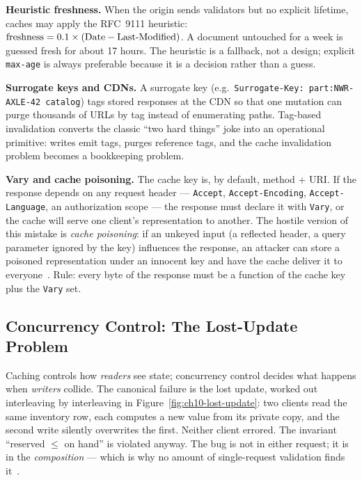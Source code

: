 \textbf{Heuristic freshness.} When the origin sends validators but no
explicit lifetime, caches may apply the RFC~9111 heuristic:
$\text{freshness} = 0.1 \times (\text{Date} - \text{Last\text{-}Modified})$.
A document untouched for a week is guessed fresh for about 17 hours. The
heuristic is a fallback, not a design; explicit \texttt{max-age} is always
preferable because it is a decision rather than a guess.

\textbf{Surrogate keys and CDNs.} A surrogate key (e.g.\
\texttt{Surrogate-Key: part:NWR-AXLE-42 catalog}) tags stored responses at
the CDN so that one mutation can purge thousands of URLs by tag instead of
enumerating paths. Tag-based invalidation converts the classic ``two hard
things'' joke into an operational primitive: writes emit tags, purges
reference tags, and the cache invalidation problem becomes a bookkeeping
problem.

\textbf{Vary and cache poisoning.} The cache key is, by default, method +
URI. If the response depends on any request header --- \texttt{Accept},
\texttt{Accept-Encoding}, \texttt{Accept-Language}, an authorization scope
--- the response must declare it with \texttt{Vary}, or the cache will serve
one client's representation to another. The hostile version of this mistake
is \emph{cache poisoning}: if an unkeyed input (a reflected header, a query
parameter ignored by the key) influences the response, an attacker can store
a poisoned representation under an innocent key and have the cache deliver
it to everyone~\cite{nygard2018releaseit}. Rule: every byte of the response
must be a function of the cache key plus the \texttt{Vary} set.

\subsection{Concurrency Control: The Lost-Update Problem}
\label{sec:ch10-concurrency}

Caching controls how \emph{readers} see state; concurrency control decides
what happens when \emph{writers} collide. The canonical failure is the lost
update, worked out interleaving by interleaving in
Figure~\ref{fig:ch10-lost-update}: two clients read the same inventory row,
each computes a new value from its private copy, and the second write
silently overwrites the first. Neither client errored. The invariant
``reserved $\leq$ on hand'' is violated anyway. The bug is not in either
request; it is in the \emph{composition} --- which is why no amount of
single-request validation finds it~\cite{kleppmann2017ddia}.

